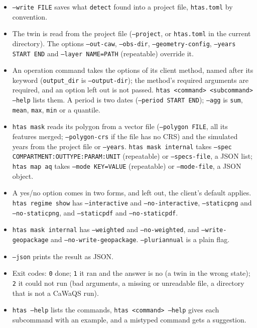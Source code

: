 \documentclass[11pt]{article}
\begin{document}
\begin{itemize}
    \item \texttt{--write FILE} saves what \texttt{detect} found into a project file, \texttt{htas.toml} by convention.
    \item The twin is read from the project file (\texttt{--project}, or \texttt{htas.toml} in the current directory). The options \texttt{--out-caw}, \texttt{--obs-dir}, \texttt{--geometry-config}, \texttt{--years START END} and \texttt{--layer NAME=PATH} (repeatable) override it.
    \item An operation command takes the options of its client method, named after its keyword (\texttt{output\_dir} is \texttt{--output-dir}); the method's required arguments are required, and an option left out is not passed. \texttt{htas <command> <subcommand> --help} lists them. A period is two dates (\texttt{--period START END}); \texttt{--agg} is \texttt{sum}, \texttt{mean}, \texttt{max}, \texttt{min} or a quantile.
    \item \texttt{htas mask} reads its polygon from a vector file (\texttt{--polygon FILE}, all its features merged; \texttt{--polygon-crs} if the file has no CRS) and the simulated years from the project file or \texttt{--years}. \texttt{htas mask internal} takes \texttt{--spec COMPARTMENT:OUTTYPE:PARAM:UNIT} (repeatable) or \texttt{--specs-file}, a JSON list; \texttt{htas map aq} takes \texttt{--mode KEY=VALUE} (repeatable) or \texttt{--mode-file}, a JSON object.
    \item A yes/no option comes in two forms, and left out, the client's default applies. \texttt{htas regime show} has \texttt{--interactive} and \texttt{--no-interactive}, \texttt{--staticpng} and \texttt{--no-staticpng}, and \texttt{--staticpdf} and \texttt{--no-staticpdf}.
    \item \texttt{htas mask internal} has \texttt{--weighted} and \texttt{--no-weighted}, and \texttt{--write-geopackage} and \texttt{--no-write-geopackage}. \texttt{--pluriannual} is a plain flag.
    \item \texttt{--json} prints the result as JSON.
    \item Exit codes: \texttt{0} done; \texttt{1} it ran and the answer is no (a twin in the wrong state); \texttt{2} it could not run (bad arguments, a missing or unreadable file, a directory that is not a CaWaQS run).
    \item \texttt{htas --help} lists the commands, \texttt{htas <command> --help} gives each subcommand with an example, and a mistyped command gets a suggestion.
\end{itemize}
\end{document}
